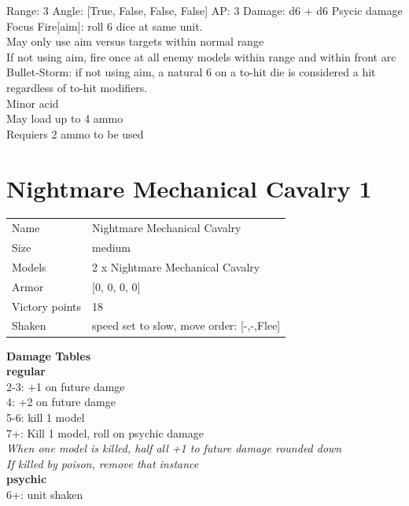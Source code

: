Range: 3  Angle: [True, False, False, False] AP: 3 Damage: d6 + d6 Psycic damage \\
Focus Fire[aim]: roll 6 dice at same unit.\\ 
May only use aim versus targets within normal range\\ 
If not using aim, fire once at all enemy models within range and within front arc\\ 
Bullet-Storm: if not using aim, a natural 6 on a to-hit die is considered a hit regardless of to-hit modifiers.\\ 
Minor acid\\ 
May load up to 4 ammo\\ 
Requiers 2 ammo to be used\\ 




 















\clearpage

\section{ Nightmare Mechanical Cavalry 1 }

\begin{tabular}{ll}
  Name & Nightmare Mechanical Cavalry \\
  Size & medium\\
  Models & 2 x Nightmare Mechanical Cavalry\\
  Armor & [0, 0, 0, 0]\\
  Victory points & 18\\
  Shaken & speed set to slow, move order: [-,-,Flee]\\
\end{tabular}




{\bf Damage Tables} \\
 {\bf regular } \\
2-3: +1 on future damge \\
4: +2 on future damge \\
5-6: kill 1 model \\
7+: Kill 1 model, roll on psychic damage \\
{{\it When one model is killed, half all +1 to future damage rounded down}} \\
{{\it If killed by poison, remove that instance}} \\
 {\bf psychic } \\
6+: unit shaken \\


